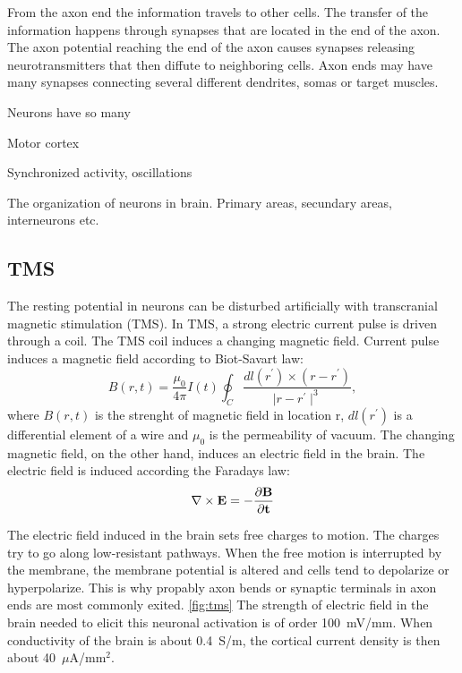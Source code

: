 \documentclass[english,12pt,a4paper,dvips]{article}
\begin{document}
From the axon end the information travels to other cells. The transfer of the information happens through synapses that are located in the end of the axon. The axon potential reaching the end of the axon causes synapses releasing neurotransmitters that then diffute to neighboring cells. Axon ends may have many synapses connecting several different dendrites, somas or target muscles.

Neurons have so many 



Motor cortex


Synchronized activity, oscillations

The organization of neurons in brain. Primary areas, secundary areas, interneurons etc.

\subsection{TMS}

The resting potential in neurons can be disturbed artificially with transcranial magnetic stimulation (TMS). In TMS, a strong electric current pulse is driven through a coil. The TMS coil induces a changing magnetic field. \cite{ilmoniemi99} Current pulse induces a magnetic field according to Biot-Savart law:
\begin{equation}
B(r,\textit{t}) = \frac{\mu_0}{4\pi}I(t) \oint_C \frac{dl(r^{\prime}) \times (r - r^{\prime})}{\mid r-r^{
\prime} \mid ^{3}},
\end{equation}
where $B(r,t)$ is the strenght of magnetic field in location r, $dl(r^{\prime})$ is a differential element of a wire and $\mu_0$ is the permeability of vacuum. The changing magnetic field, on the other hand, induces an electric 
field in the brain. The electric field is induced according the Faradays law:
\begin{equation}
\nabla \times \bf{E} = - \frac{\partial \bf{B}}{\partial t}
\end{equation}


The electric field induced in the brain sets free charges to motion. The charges try to go along low-resistant pathways. When the free motion is interrupted by the membrane, the membrane potential is altered and cells tend to depolarize or hyperpolarize. This is why propably axon bends or synaptic terminals in axon ends are most commonly exited. \ref{fig:tms} The strength of electric field in the brain needed to elicit this neuronal activation is of order 100~mV/mm. When conductivity of the brain is about 0.4~S/m, the cortical current density is then about 40~$\mu$A/mm$^2$. \cite{ilmoniemi99} 
\end{document}
